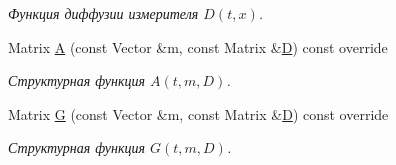\begin{DoxyCompactItemize}
\begin{DoxyCompactList}\small\item\em Функция диффузии измерителя $D(t,x)$. \end{DoxyCompactList}\item 
Matrix \hyperlink{class_tasks_1_1_continuous_1_1_van_der_pol_linear_a2eefb5fca01c3517c44d2683032fda9d}{A} (const Vector \&m, const Matrix \&\hyperlink{class_tasks_1_1_continuous_1_1_van_der_pol_linear_a07e8842a175006f214238a9f71e5ebdf}{D}) const override
\begin{DoxyCompactList}\small\item\em Структурная функция $A(t, m, D)$. \end{DoxyCompactList}\item 
Matrix \hyperlink{class_tasks_1_1_continuous_1_1_van_der_pol_linear_a931ba012a9671d8f522975232b48320f}{G} (const Vector \&m, const Matrix \&\hyperlink{class_tasks_1_1_continuous_1_1_van_der_pol_linear_a07e8842a175006f214238a9f71e5ebdf}{D}) const override
\begin{DoxyCompactList}\small\item\em Структурная функция $G(t, m, D)$. \end{DoxyCompactList}\end{DoxyCompactItemize}
